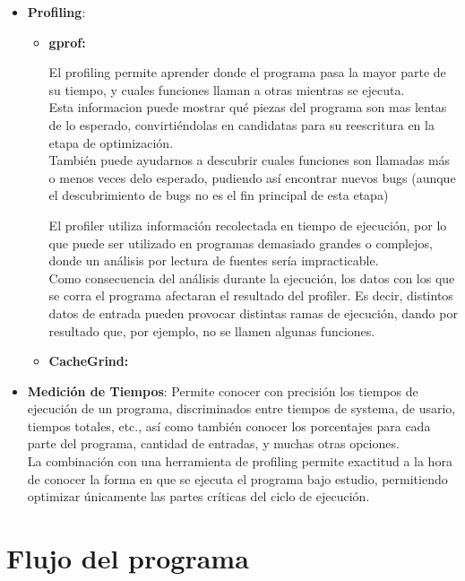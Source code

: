 \documentclass[a4paper,10pt]{article}
\begin{document}
\begin{itemize}
 \item \textbf{Profiling}: 

\begin{itemize}
	
\item {\textbf{gprof:} } {El profiling permite aprender donde el programa pasa la mayor parte de su tiempo, y cuales funciones llaman a otras mientras se ejecuta.\\
 			   Esta informacion puede mostrar qu\'e piezas del programa son mas lentas de lo esperado, convirti\'endolas en candidatas para su reescritura en la etapa de optimizaci\'on.\\
 			   Tambi\'en puede ayudarnos a descubrir cuales funciones son llamadas m\'as o menos veces delo esperado, pudiendo as\'i encontrar nuevos bugs (aunque el descubrimiento de bugs no es el fin principal de esta etapa)
 			   
			   El profiler utiliza informaci\'on recolectada en tiempo de ejecuci\'on, por lo que puede ser utilizado en programas demasiado grandes o complejos, donde un an\'alisis por lectura de fuentes ser\'ia impracticable.\\
			   Como consecuencia del an\'alisis durante la ejecuci\'on, los datos con los que se corra el programa afectaran el resultado del profiler. 
			   Es decir, distintos datos de entrada pueden provocar distintas ramas de ejecuci\'on, dando por resultado que, por ejemplo, no se llamen algunas funciones.}

\item{\textbf{CacheGrind:}}{}
			
\end{itemize}
			   
\item \textbf{Medici\'on de Tiempos}: Permite conocer con precisi\'on los tiempos de ejecuci\'on de un programa, discriminados entre tiempos de systema, de usario, tiempos totales, etc., as\'i como tambi\'en conocer los porcentajes para cada parte del programa, cantidad de entradas, y muchas otras opciones.\\
				     La combinaci\'on con una herramienta de profiling permite exactitud a la hora de conocer la forma en que se ejecuta el programa bajo estudio, permitiendo optimizar \'unicamente las partes cr\'iticas del ciclo de ejecuci\'on.
\end{itemize}


\newpage


\section{Flujo del programa}
\end{document}
